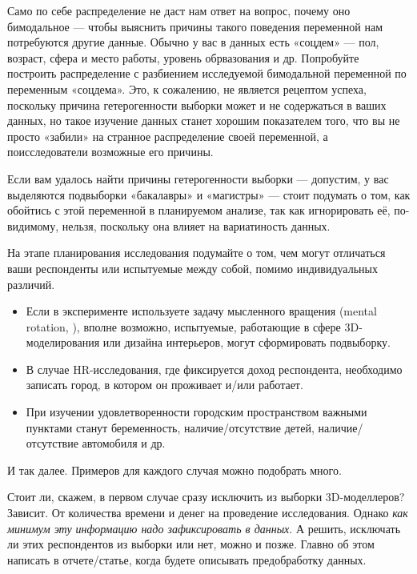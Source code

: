 \documentclass[
  letterpaper,
]{scrbook}
\providecommand{\tightlist}{%
  \setlength{\itemsep}{0pt}\setlength{\parskip}{0pt}}\usepackage{longtable,booktabs,array}
\theoremstyle{definition}
\theoremstyle{remark}
\begin{document}
Само по себе распределение не даст нам ответ на вопрос, почему оно
бимодальное --- чтобы выяснить причины такого поведения переменной нам
потребуются другие данные. Обычно у вас в данных есть «соцдем» --- пол,
возраст, сфера и место работы, уровень обрвазования и др. Попробуйте
построить распределение с разбиением исследуемой бимодальной переменной
по переменным «соцдема». Это, к сожалению, не является рецептом успеха,
поскольку причина гетерогенности выборки может и не содержаться в ваших
данных, но такое изучение данных станет хорошим показателем того, что вы
не просто «забили» на странное распределение своей переменной, а
поисследователи возможные его причины.

Если вам удалось найти причины гетерогенности выборки --- допустим, у
вас выделяются подвыборки «бакалавры» и «магистры» --- стоит подумать о
том, как обойтись с этой переменной в планируемом анализе, так как
игнорировать её, по-видимому, нельзя, поскольку она влияет на
вариатиность данных.

\begin{tcolorbox}[enhanced jigsaw, colback=white, bottomrule=.15mm, opacityback=0, opacitybacktitle=0.6, breakable, coltitle=black, colframe=quarto-callout-tip-color-frame, titlerule=0mm, rightrule=.15mm, bottomtitle=1mm, leftrule=.75mm, toptitle=1mm, left=2mm, arc=.35mm, title=\textcolor{quarto-callout-tip-color}{\faLightbulb}\hspace{0.5em}{Соцдем лишним не бывает}, colbacktitle=quarto-callout-tip-color!10!white, toprule=.15mm]

На этапе планирования исследования подумайте о том, чем могут отличаться
ваши респонденты или испытуемые между собой, помимо индивидуальных
различий.

\begin{itemize}
\tightlist
\item
  Если в эксперименте используете задачу мысленного вращения (mental
  rotation, \autocite{shepard71}), вполне возможно, испытуемые,
  работающие в сфере 3D-моделирования или дизайна интерьеров, могут
  сформировать подвыборку.
\item
  В случае HR-исследования, где фиксируется доход респондента,
  необходимо записать город, в котором он проживает и/или работает.
\item
  При изучении удовлетворенности городским пространством важными
  пунктами станут беременность, наличие/отсутствие детей,
  наличие/отсутствие автомобиля и др.
\end{itemize}

И так далее. Примеров для каждого случая можно подобрать много.

Стоит ли, скажем, в первом случае сразу исключить из выборки
3D-моделлеров? Зависит. От количества времени и денег на проведение
исследования. Однако \emph{как минимум эту информацию надо зафиксировать
в данных}. А решить, исключать ли этих респондентов из выборки или нет,
можно и позже. Главно об этом написать в отчете/статье, когда будете
описывать предобработку данных.

\end{tcolorbox}
\end{document}
